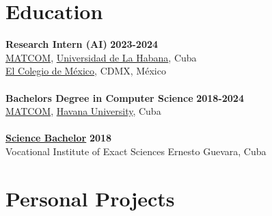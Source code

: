 \documentclass{article}
\begin{document}
\section*{Education}
\textbf{Research Intern (AI)} \hfill \textbf{2023-2024}\\
\href{https://matcom.in/}{MATCOM}, \href{https://uh.cu}{Universidad de La Habana}, Cuba\\
\href{https://www.colmex.mx/}{El Colegio de M\'exico}, CDMX, M\'exico\\
\vspace{0.1cm}\\
\textbf{Bachelors Degree in Computer Science} \hfill \textbf{2018-2024}\\
\href{https://matcom.in/}{MATCOM}, \href{https://uh.cu}{Havana University}, Cuba\\
\vspace{0.1cm}\\
\textbf{\hyperref[sec:bachelor]{Science Bachelor}} \hfill \textbf{2018}\\
Vocational Institute of Exact Sciences  Ernesto Guevara, Cuba

\section*{Personal Projects}



\end{document}
